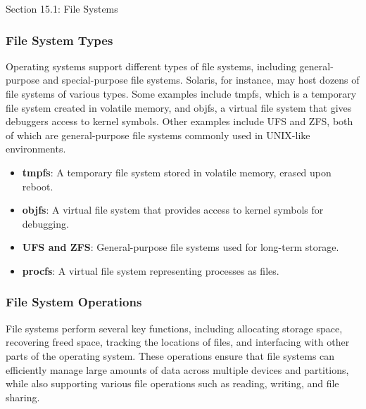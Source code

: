 \begin{notes}{Section 15.1: File Systems}
\begin{highlight}
    \end{highlight}
    
    \subsubsection*{File System Types}
    
    Operating systems support different types of file systems, including general-purpose and special-purpose file systems. Solaris, for instance, may host dozens of file systems of various types. Some 
    examples include tmpfs, which is a temporary file system created in volatile memory, and objfs, a virtual file system that gives debuggers access to kernel symbols. Other examples include UFS and ZFS, 
    both of which are general-purpose file systems commonly used in UNIX-like environments.
    
    \begin{highlight}
    
        \begin{itemize}
            \item \textbf{tmpfs}: A temporary file system stored in volatile memory, erased upon reboot.
            \item \textbf{objfs}: A virtual file system that provides access to kernel symbols for debugging.
            \item \textbf{UFS and ZFS}: General-purpose file systems used for long-term storage.
            \item \textbf{procfs}: A virtual file system representing processes as files.
        \end{itemize}
    
    \end{highlight}
    
    \subsubsection*{File System Operations}
    
    File systems perform several key functions, including allocating storage space, recovering freed space, tracking the locations of files, and interfacing with other parts of the operating system. These 
    operations ensure that file systems can efficiently manage large amounts of data across multiple devices and partitions, while also supporting various file operations such as reading, writing, and file sharing.
    
    \begin{highlight}
    

\end{highlight}
\end{notes}
